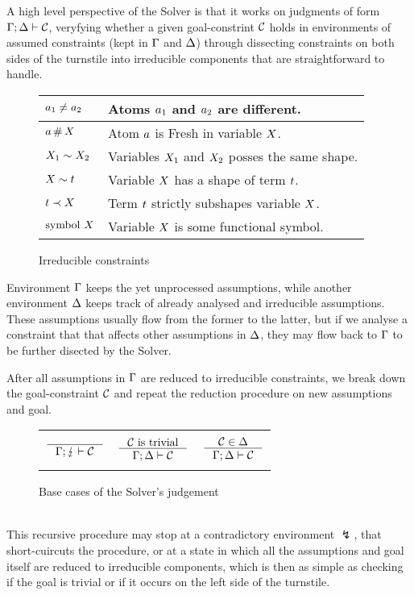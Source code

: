 \documentclass[english, mgr]{iithesis}
\newcommand{\solverRule}{\vdash}
\begin{document}
A high level perspective of the Solver is that it works on judgments of form
$\cEnv; \icEnv \solverRule \sconstr$, veryfying  whether a given goal-constrint $\mathcal{C}$
holds in environments of assumed constraints (kept in $\Gamma$ and $\Delta$)
through dissecting constraints on both sides of the turnstile into
irreducible components that are straightforward to handle.
\begin{figure}
  \centering
  \begin{tabularx}{\textwidth}{|l|X|}
    \hline
    $a_1 \neq a_2$
    & Atoms $a_1$ and $a_2$ are different.
    \\ \hline
    $a   \,\#\, X$
    & Atom $a$ is {Fresh} in variable $X$.
    \\ \hline
    $X_1 \sim  X_2$
    & Variables $X_1$ and $X_2$ posses the same shape.
    \\ \hline
    $X   \sim  t$
    & Variable $X$ has a shape of term $t$.
    \\ \hline
    $t    \prec  X$
    & Term $t$ strictly subshapes variable $X$.
    \\ \hline
    $\text{symbol } X$
    & Variable $X$ is some functional symbol.
    \\ \hline
  \end{tabularx}
  \caption{Irreducible constraints}
  \label{fig:irreducible-constraints}
\end{figure}
Environment $\Gamma$ keeps the yet unprocessed assumptions,
while another environment $\Delta$ keeps track of already analysed and irreducible assumptions.
These assumptions usually flow from the former to the latter, but if we analyse
a constraint that that affects other assumptions in $\Delta$,
they may flow back to $\Gamma$ to be further disected by the Solver.


After all assumptions in $\Gamma$ are reduced to irreducible constraints,
we break down the goal-constraint $\mathcal{C}$ and repeat the reduction procedure on
new assumptions and goal.
\begin{figure}[htpb]
  \centering
    \begin{tabularx}{\textwidth}{|CCC|}
    \hline & & \\ $
      \inference{
      }{
        \cEnv ; \lightning \solverRule \sconstr
      }
      $ & $
      \inference{
        \sconstr \text{ is trivial}
      }{
        \cEnv ; \icEnv \solverRule \sconstr
      } $ & $
      \inference{
        \sconstr \in \icEnv
      }{
        \cEnv ; \icEnv \solverRule \sconstr
      } $ \\ & & \\ \hline
    \end{tabularx}
  \caption{Base cases of the Solver's judgement}
  \label{fig:solver-base}
\end{figure}
\\
This recursive procedure may stop at a contradictory environment $\lightning$,
that short-cuircuts the procedure, or at
a state in which all the assumptions and goal itself are reduced to irreducible components,
which is then as simple as checking if the goal is trivial or if it
occurs on the left side of the turnstile.
\end{document}
